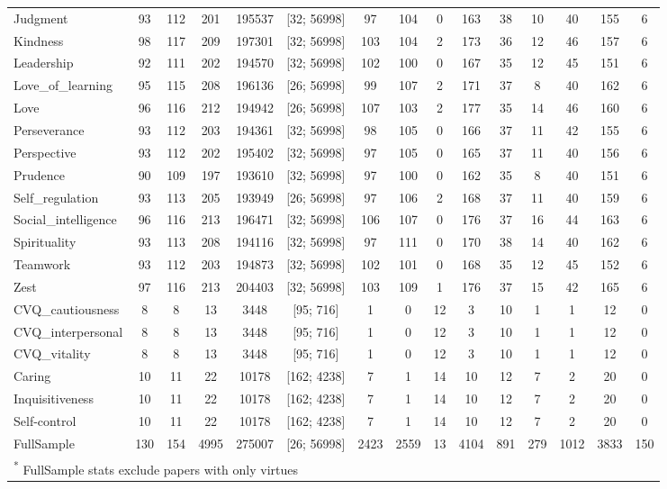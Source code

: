 \documentclass[
  man,floatsintext]{apa6}
\begin{document}
\begin{table}
{\begin{tabular}[t]{lcccccccccccccc}
Judgment & 93 & 112 & 201 & 195537 & {}[32; 56998] & 97 & 104 & 0 & 163 & 38 & 10 & 40 & 155 & 6\\
Kindness & 98 & 117 & 209 & 197301 & {}[32; 56998] & 103 & 104 & 2 & 173 & 36 & 12 & 46 & 157 & 6\\
Leadership & 92 & 111 & 202 & 194570 & {}[32; 56998] & 102 & 100 & 0 & 167 & 35 & 12 & 45 & 151 & 6\\
Love\_of\_learning & 95 & 115 & 208 & 196136 & {}[26; 56998] & 99 & 107 & 2 & 171 & 37 & 8 & 40 & 162 & 6\\
\addlinespace
Love & 96 & 116 & 212 & 194942 & {}[26; 56998] & 107 & 103 & 2 & 177 & 35 & 14 & 46 & 160 & 6\\
Perseverance & 93 & 112 & 203 & 194361 & {}[32; 56998] & 98 & 105 & 0 & 166 & 37 & 11 & 42 & 155 & 6\\
Perspective & 93 & 112 & 202 & 195402 & {}[32; 56998] & 97 & 105 & 0 & 165 & 37 & 11 & 40 & 156 & 6\\
Prudence & 90 & 109 & 197 & 193610 & {}[32; 56998] & 97 & 100 & 0 & 162 & 35 & 8 & 40 & 151 & 6\\
Self\_regulation & 93 & 113 & 205 & 193949 & {}[26; 56998] & 97 & 106 & 2 & 168 & 37 & 11 & 40 & 159 & 6\\
\addlinespace
Social\_intelligence & 96 & 116 & 213 & 196471 & {}[32; 56998] & 106 & 107 & 0 & 176 & 37 & 16 & 44 & 163 & 6\\
Spirituality & 93 & 113 & 208 & 194116 & {}[32; 56998] & 97 & 111 & 0 & 170 & 38 & 14 & 40 & 162 & 6\\
Teamwork & 93 & 112 & 203 & 194873 & {}[32; 56998] & 102 & 101 & 0 & 168 & 35 & 12 & 45 & 152 & 6\\
Zest & 97 & 116 & 213 & 204403 & {}[32; 56998] & 103 & 109 & 1 & 176 & 37 & 15 & 42 & 165 & 6\\
CVQ\_cautiousness & 8 & 8 & 13 & 3448 & {}[95; 716] & 1 & 0 & 12 & 3 & 10 & 1 & 1 & 12 & 0\\
\addlinespace
CVQ\_interpersonal & 8 & 8 & 13 & 3448 & {}[95; 716] & 1 & 0 & 12 & 3 & 10 & 1 & 1 & 12 & 0\\
CVQ\_vitality & 8 & 8 & 13 & 3448 & {}[95; 716] & 1 & 0 & 12 & 3 & 10 & 1 & 1 & 12 & 0\\
Caring & 10 & 11 & 22 & 10178 & {}[162; 4238] & 7 & 1 & 14 & 10 & 12 & 7 & 2 & 20 & 0\\
Inquisitiveness & 10 & 11 & 22 & 10178 & {}[162; 4238] & 7 & 1 & 14 & 10 & 12 & 7 & 2 & 20 & 0\\
Self-control & 10 & 11 & 22 & 10178 & {}[162; 4238] & 7 & 1 & 14 & 10 & 12 & 7 & 2 & 20 & 0\\
\addlinespace
FullSample & 130 & 154 & 4995 & 275007 & {}[26; 56998] & 2423 & 2559 & 13 & 4104 & 891 & 279 & 1012 & 3833 & 150\\
\bottomrule
\multicolumn{15}{l}{\textsuperscript{*} FullSample stats exclude papers with only virtues}\\
\end{tabular}}
\end{table}
\end{document}
